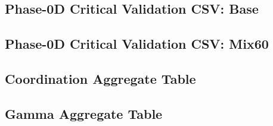 \documentclass[11pt]{article}
\begin{document}
\subsection{Phase-0D Critical Validation CSV: Base}


\subsection{Phase-0D Critical Validation CSV: Mix60}


\subsection{Coordination Aggregate Table}


\subsection{Gamma Aggregate Table}

\end{document}
